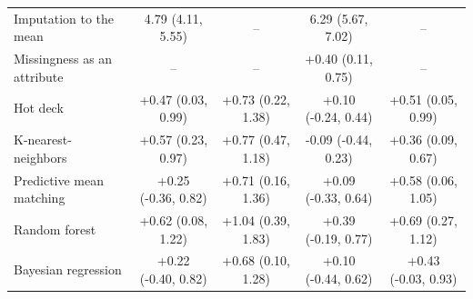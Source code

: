 \documentclass{article}
\begin{document}
\begin{table}
\begin{tabular}{lcccc}
\midrule
Imputation to the mean & 4.79 (4.11, 5.55) & -- & 6.29 (5.67, 7.02) & -- \\ 
Missingness as an attribute & -- & -- & +0.40 (0.11, 0.75) & -- \\ 
Hot deck & +0.47 (0.03, 0.99) & +0.73 (0.22, 1.38) & +0.10 (-0.24, 0.44) & +0.51 (0.05, 0.99) \\ 
K-nearest-neighbors & +0.57 (0.23, 0.97) & +0.77 (0.47, 1.18) & -0.09 (-0.44, 0.23) & +0.36 (0.09, 0.67) \\ 
Predictive mean matching & +0.25 (-0.36, 0.82) & +0.71 (0.16, 1.36) & +0.09 (-0.33, 0.64) & +0.58 (0.06, 1.05) \\ 
Random forest & +0.62 (0.08, 1.22) & +1.04 (0.39, 1.83) & +0.39 (-0.19, 0.77) & +0.69 (0.27, 1.12) \\ 
Bayesian regression & +0.22 (-0.40, 0.82) & +0.68 (0.10, 1.28) & +0.10 (-0.44, 0.62) & +0.43 (-0.03, 0.93) \\ 
\bottomrule
\end{tabular} 
 \end{table}

\clearpage
\end{document}
